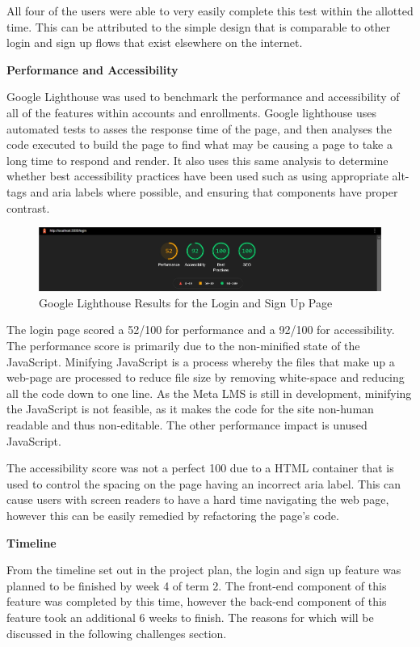 All four of the users were able to very easily complete this test within the allotted time. This can be attributed to the simple design that is comparable to other login and sign up flows that exist elsewhere on the internet.

\textbf{Performance and Accessibility}

Google Lighthouse was used to benchmark the performance and accessibility of all of the features within accounts and enrollments. Google lighthouse uses automated tests to asses the response time of the page, and then analyses the code executed to build the page to find what may be causing a page to take a long time to respond and render. It also uses this same analysis to determine whether best accessibility practices have been used such as using appropriate alt-tags and aria labels where possible, and ensuring that components have proper contrast.

\begin{figure}[h!]
    \centering
    \includegraphics[scale=0.3]{images/accounts-login-lighthouse.jpg}
    \caption{Google Lighthouse Results for the Login and Sign Up Page}
\end{figure}

The login page scored a 52/100 for performance and a 92/100 for accessibility. The performance score is primarily due to the non-minified state of the JavaScript. Minifying JavaScript is a process whereby the files that make up a web-page are processed to reduce file size by removing white-space and reducing all the code down to one line. As the Meta LMS is still in development, minifying the JavaScript is not feasible, as it makes the code for the site non-human readable and thus non-editable. The other performance impact is unused JavaScript.

The accessibility score was not a perfect 100 due to a HTML container that is used to control the spacing on the page having an incorrect aria label. This can cause users with screen readers to have a hard time navigating the web page, however this can be easily remedied by refactoring the page's code.

\textbf{Timeline}

From the timeline set out in the project plan, the login and sign up feature was planned to be finished by week 4 of term 2. The front-end component of this feature was completed by this time, however the back-end component of this feature took an additional 6 weeks to finish. The reasons for which will be discussed in the following challenges section.

